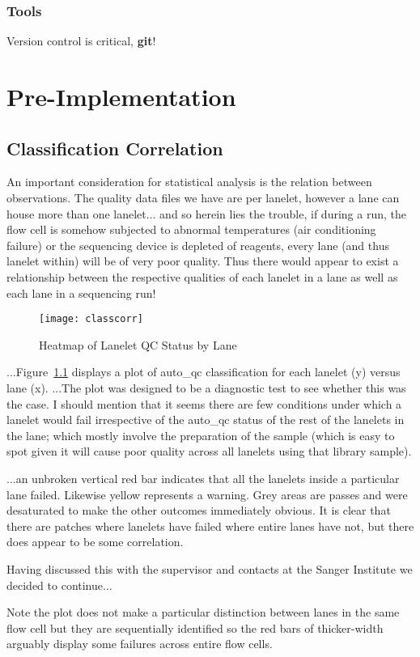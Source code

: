 \subsection{Tools}
Version control is critical, \textbf{git}!


\chapter{Pre-Implementation}
\section{Classification Correlation}

An important consideration for statistical analysis is the relation between
observations. The quality data files we have are per lanelet, however a lane
can house more than one lanelet...  and so herein lies the trouble, if during a
run, the flow cell is somehow subjected to abnormal temperatures (air
conditioning failure) or the sequencing device is depleted of reagents, every
lane (and thus lanelet within) will be of very poor quality. Thus there would
appear to exist a relationship between the respective qualities of each lanelet
in a lane as well as each lane in a sequencing run!

\begin{figure}[htbp!]
    \centering
    \texttt{[image: classcorr]}
    \caption[ClassCorr]{Heatmap of Lanelet QC Status by Lane}
    \label{fig:classcorr}
\end{figure}

...Figure~\ref{fig:classcorr} displays a plot of auto\_qc classification for
each lanelet (y) versus lane (x). ...The plot was designed to be a diagnostic
test to see whether this was the case. I should mention that it seems there are
few conditions under which a lanelet would fail irrespective of the auto\_qc
status of the rest of the lanelets in the lane; which mostly involve the
preparation of the sample (which is easy to spot given it will cause poor
quality across all lanelets using that library sample).

...an unbroken vertical red bar indicates that all the lanelets inside a
particular lane failed. Likewise yellow represents a warning. Grey areas are
passes and were desaturated to make the other outcomes immediately obvious. It
is clear that there are patches where lanelets have failed where entire lanes
have not, but there does appear to be some correlation.

Having discussed this with the supervisor and contacts at the Sanger Institute
we decided to continue...

Note the plot does not make a particular distinction between lanes in the same
flow cell but they are sequentially identified so the red bars of thicker-width
arguably display some failures across entire flow cells.


